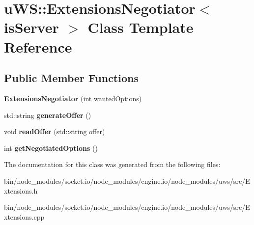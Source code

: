 \hypertarget{classu_w_s_1_1_extensions_negotiator}{}\section{u\+WS\+:\+:Extensions\+Negotiator$<$ is\+Server $>$ Class Template Reference}
\label{classu_w_s_1_1_extensions_negotiator}
\subsection*{Public Member Functions}
\begin{DoxyCompactItemize}
\item 
\mbox{\label{classu_w_s_1_1_extensions_negotiator_aa9452673300eb466342b932b7ef29967}} 
{\bfseries Extensions\+Negotiator} (int wanted\+Options)
\item 
\mbox{\label{classu_w_s_1_1_extensions_negotiator_a59e0c097c9d62f6281ac4a8d4bcec493}} 
std\+::string {\bfseries generate\+Offer} ()
\item 
\mbox{\label{classu_w_s_1_1_extensions_negotiator_a060766cb4d2fcc5e33ca23ea7205ff82}} 
void {\bfseries read\+Offer} (std\+::string offer)
\item 
\mbox{\label{classu_w_s_1_1_extensions_negotiator_a7b5422124bf4e0bfb6a5245454718578}} 
int {\bfseries get\+Negotiated\+Options} ()
\end{DoxyCompactItemize}


The documentation for this class was generated from the following files\+:\begin{DoxyCompactItemize}
\item 
bin/node\+\_\+modules/socket.\+io/node\+\_\+modules/engine.\+io/node\+\_\+modules/uws/src/Extensions.\+h\item 
bin/node\+\_\+modules/socket.\+io/node\+\_\+modules/engine.\+io/node\+\_\+modules/uws/src/Extensions.\+cpp\end{DoxyCompactItemize}
